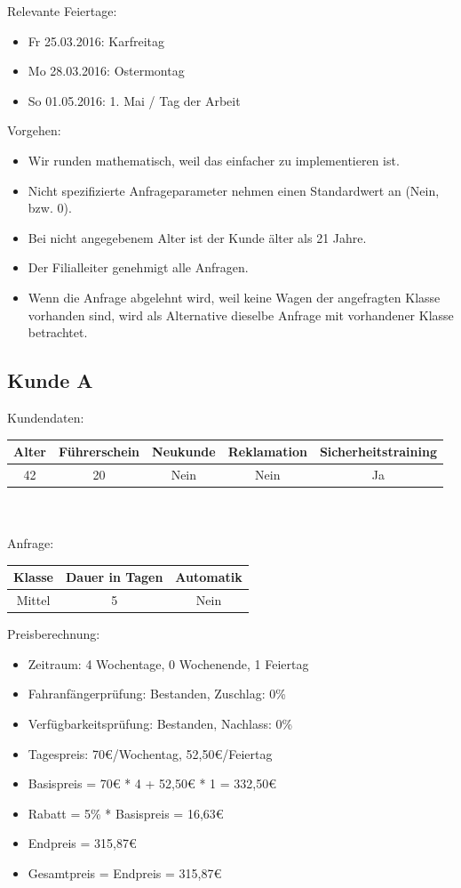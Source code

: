 Relevante Feiertage:
\begin{itemize}
	\item Fr 25.03.2016: Karfreitag
	\item Mo 28.03.2016: Ostermontag
	\item So 01.05.2016: 1. Mai / Tag der Arbeit
\end{itemize}

Vorgehen:
\begin{itemize}
	\item Wir runden mathematisch, weil das einfacher zu implementieren ist.
	\item Nicht spezifizierte Anfrageparameter nehmen einen Standardwert an (Nein, bzw. 0).
	\item Bei nicht angegebenem Alter ist der Kunde älter als 21 Jahre.
	\item Der Filialleiter genehmigt alle Anfragen.
	\item Wenn die Anfrage abgelehnt wird, weil keine Wagen der angefragten Klasse vorhanden sind,
		wird als Alternative dieselbe Anfrage mit vorhandener Klasse betrachtet.
\end{itemize}

\subsection{Kunde A}

Kundendaten:\\
\begin{tabular}{|c|c|c|c|c|}
	\hline \textbf{Alter} & \textbf{Führerschein} & \textbf{Neukunde} & \textbf{Reklamation} & \textbf{Sicherheitstraining} \\ 
	\hline 42 & 20 & Nein & Nein & Ja \\ 
	\hline 
\end{tabular} 
\\\\
Anfrage:\\
\begin{tabular}{|c|c|c|}
	\hline \textbf{Klasse} & \textbf{Dauer in Tagen} & \textbf{Automatik} \\ 
	\hline Mittel & 5 & Nein \\ 
	\hline 
\end{tabular}

\vspace{12pt}
Preisberechnung:
\begin{itemize}
	\item Zeitraum: 4 Wochentage, 0 Wochenende, 1 Feiertag
	\item Fahranfängerprüfung: Bestanden, Zuschlag: 0\%
	\item Verfügbarkeitsprüfung: Bestanden, Nachlass: 0\%
	\item Tagespreis: 70€/Wochentag, 52,50€/Feiertag
	\item Basispreis = 70€ * 4 + 52,50€ * 1 = 332,50€
	\item Rabatt = 5\% * Basispreis = 16,63€
	\item Endpreis = 315,87€
	\item Gesamtpreis = Endpreis = 315,87€
\end{itemize}

